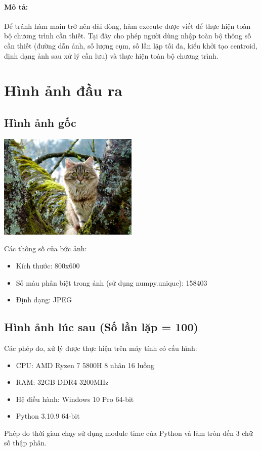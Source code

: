 \documentclass{article}
\begin{document}
\paragraph{Mô tả:}
Để tránh hàm main trở nên dài dòng, hàm execute được viết để thực hiện toàn bộ chương trình cần thiết. Tại đây cho phép người dùng nhập toàn bộ thông số cần thiết (đường dẫn ảnh, số lượng cụm, số lần lặp tối đa, kiểu khởi tạo centroid, định dạng ảnh sau xử lý cần lưu) và thực hiện toàn bộ chương trình.

\section{Hình ảnh đầu ra}
\subsection{Hình ảnh gốc}
\centerline{\includegraphics[width=0.5\textwidth]{image/cat.jpg}}
Các thông số của bức ảnh:
\begin{itemize}
    \item Kích thước: 800x600
    \item Số màu phân biệt trong ảnh (sử dụng numpy.unique): 158403
    \item Định dạng: JPEG
\end{itemize}

\subsection{Hình ảnh lúc sau (Số lần lặp = 100)}
Các phép đo, xử lý được thực hiện trên máy tính có cấu hình:
\begin{itemize}
    \item CPU: AMD Ryzen 7 5800H 8 nhân 16 luồng
    \item RAM: 32GB DDR4 3200MHz
    \item Hệ điều hành: Windows 10 Pro 64-bit
    \item Python 3.10.9 64-bit
\end{itemize}
Phép đo thời gian chạy sử dụng module time của Python và làm tròn đến 3 chữ số thập phân.
\end{document}
